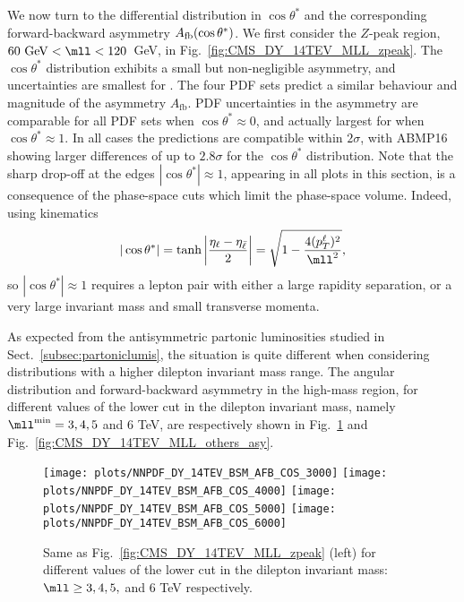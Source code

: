 We now turn to the differential distribution in
  $\cos\theta^*$ 
  and the corresponding forward-backward asymmetry $A_{\rm
    fb}(\cos\theta^*)$.
We first consider the $Z$-peak region, $60~{\rm GeV} < \mll <
120$~GeV, in Fig.~\ref{fig:CMS_DY_14TEV_MLL_zpeak}.
%
The $\cos\theta^*$ 
distribution exhibits a small but non-negligible asymmetry,
and uncertainties are  smallest for .
%
The four PDF sets predict a similar behaviour and magnitude
of the asymmetry $A_\mathrm{fb}$.
%
PDF uncertainties in the asymmetry
are  comparable for  all PDF sets when $\cos\theta^* \approx0$,
and actually  largest for  when $\cos\theta^* \approx 1$.
In all cases the predictions are compatible within $2 \sigma$,
with ABMP16 showing larger differences of up to $2.8 \sigma$ for the $\cos\theta^*$
distribution.
%
Note that the
sharp drop-off at the edges $|\cos\theta^*| \approx  1$, appearing in
all plots in this section, is a consequence of the phase-space cuts which
limit the phase-space volume.
%
Indeed, using  \lo kinematics
\begin{equation}
| \cos\theta^* | = \tanh \left| \frac{\eta_\ell - \eta_{\bar{\ell}}}{2} \right| = \sqrt{1 - \frac{4 (p_T^\ell)^2}{\mll^2}} \text{,}
\end{equation}
so $| \cos\theta^* | \approx 1$ requires a lepton pair with either
a large rapidity separation, or a very large invariant mass and small
transverse momenta. 

As expected from the antisymmetric partonic luminosities studied in
Sect.~\ref{subsec:partoniclumis}, the situation is quite different when
considering distributions with a higher dilepton invariant mass range.
%
The angular distribution and forward-backward asymmetry
in the high-mass region, for different values of the  lower cut in the dilepton
 invariant mass, namely $\mll^{\rm min}=3, 4,5$ and 6 TeV, are
 respectively
 shown in
Fig.~\ref{fig:CMS_DY_14TEV_MLL_others} and Fig.~\ref{fig:CMS_DY_14TEV_MLL_others_asy}.

\begin{figure}[t!]
 \centering
 \texttt{[image: plots/NNPDF\_DY\_14TEV\_BSM\_AFB\_COS\_3000]}
 \texttt{[image: plots/NNPDF\_DY\_14TEV\_BSM\_AFB\_COS\_4000]}
 \texttt{[image: plots/NNPDF\_DY\_14TEV\_BSM\_AFB\_COS\_5000]}
 \texttt{[image: plots/NNPDF\_DY\_14TEV\_BSM\_AFB\_COS\_6000]}
 \caption{Same as Fig.~\ref{fig:CMS_DY_14TEV_MLL_zpeak} (left)
   for different values of the  lower cut in the dilepton
   invariant mass: $\mll \ge 3, 4,5,$ and 6 TeV respectively.
  }    
 \label{fig:CMS_DY_14TEV_MLL_others}
\end{figure}

